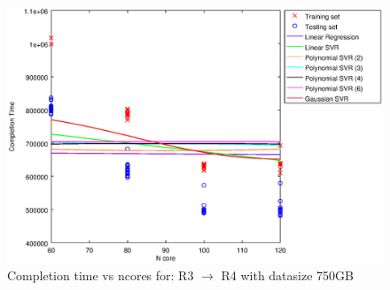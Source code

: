 
\begin {figure}[hbtp]
\centering
\includegraphics[width=\textwidth]{output/R3_R4_750_ALL_FEATURES/plot_R3_R4_750.eps}
\caption{Completion time vs ncores for: R3 $\rightarrow$ R4 with datasize 750GB}
\label{fig:coreonly_linear_R3_R4_750}
\end {figure}
